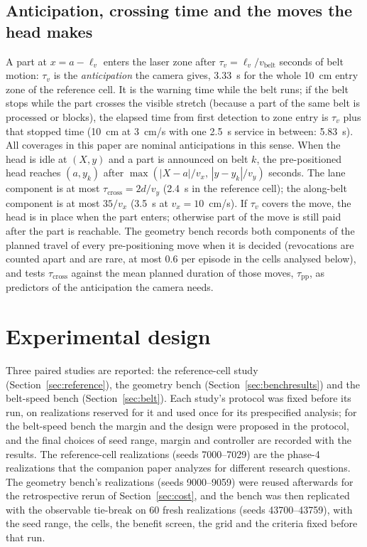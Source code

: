 \documentclass[11pt,a4paper]{article}
\newcommand{\tcross}{\tau_{\mathrm{cross}}}
\newcommand{\tpp}{\tau_{\mathrm{pp}}}
\newcommand{\tv}{\tau_{v}}
\newcommand{\lv}{\ell_{v}}
\newcommand{\vb}{v_{\mathrm{belt}}}
\begin{document}
\subsection{Anticipation, crossing time and the moves the head makes}\label{sec:anticipation}
A part at $x=a-\lv$ enters the laser zone after $\tv=\lv/\vb$ seconds of belt motion:
$\tv$ is the \emph{anticipation} the camera gives, 3.33~s for the whole 10~cm entry zone of
the reference cell. It is the warning time while the belt runs; if the belt stops while the
part crosses the visible stretch (because a part of the same belt is processed or blocks),
the elapsed time from first detection to zone entry is $\tv$ plus that stopped time (10~cm
at 3~cm/s with one 2.5~s service in between: 5.83~s). All coverages in this paper are
nominal anticipations in this sense. When the head is idle at $(X,y)$ and a part is
announced on belt $k$, the pre-positioned head reaches $(a,y_k)$ after
$\max(|X-a|/v_x,\,|y-y_k|/v_y)$ seconds. The lane component is at most
$\tcross=2d/v_y$ (2.4~s in the reference cell); the along-belt component is at most
$35/v_x$ (3.5~s at $v_x=10$~cm/s). If $\tv$ covers the move, the head is in place when the
part enters; otherwise part of the move is still paid after the part is reachable. The
geometry bench records both components of the planned travel of every pre-positioning
move when it is decided (revocations are counted apart and are rare, at most 0.6 per
episode in the cells analysed below), and tests $\tcross$ against the mean planned
duration of those moves, $\tpp$, as predictors of the anticipation the camera needs.

\section{Experimental design}\label{sec:design}
Three paired studies are reported: the reference-cell study (Section~\ref{sec:reference}),
the geometry bench (Section~\ref{sec:benchresults}) and the belt-speed bench
(Section~\ref{sec:belt}). Each study's protocol was fixed before its run, on realizations
reserved for it and used once for its prespecified analysis; for the belt-speed bench the
margin and the design were proposed in the protocol, and the final choices of seed range,
margin and controller are recorded with the results. The reference-cell realizations
(seeds 7000--7029) are the phase-4 realizations that the companion paper analyzes for
different research questions. The geometry bench's realizations (seeds 9000--9059) were
reused afterwards for the retrospective rerun of Section~\ref{sec:cost}, and the bench was
then replicated with the observable tie-break on 60 fresh realizations (seeds
43700--43759), with the seed range, the cells, the benefit screen, the grid and the
criteria fixed before that run.
\end{document}
